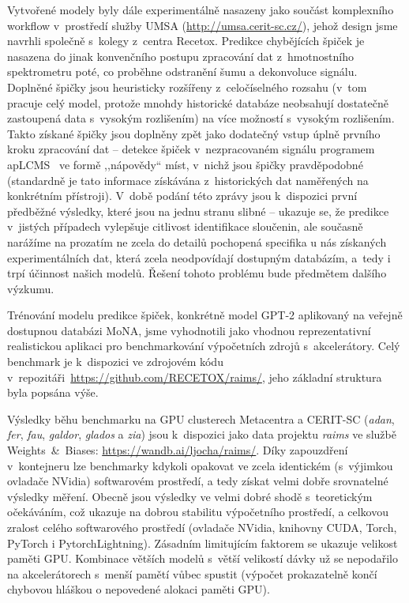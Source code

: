\documentclass[a4paper,11pt]{article}
\begin{document}
Vytvořené modely byly dále experimentálně nasazeny jako součást komplexního workflow
v~prostředí služby UMSA (\url{http://umsa.cerit-sc.cz/}),
jehož design jsme navrhli společně s~kolegy z~centra Recetox.
Predikce chybějících špiček je nasazena do jinak konvenčního postupu zpracování 
dat z~hmotnostního spektrometru poté, co proběhne odstranění šumu a dekonvoluce signálu.
Doplněné špičky jsou heuristicky rozšířeny z~celočíselného rozsahu
(v~tom pracuje celý model, protože mnohdy historické databáze neobsahují dostatečně
zastoupená data s~vysokým rozlišením) na více možností s~vysokým rozlišením.
Takto získané špičky jsou doplněny zpět jako dodatečný vstup úplně prvního kroku
zpracování dat -- detekce špiček v~nezpracovaném signálu programem apLCMS~\cite{aplcms}
ve formě ,,nápovědy`` míst, v~nichž jsou špičky pravděpodobné (standardně je tato informace
získávána z~historických dat naměřených na konkrétním přístroji).
V~době podání této zprávy jsou k~dispozici první předběžné výsledky, které jsou na jednu stranu
slibné -- ukazuje se, že predikce v~jistých případech vylepšuje citlivost identifikace sloučenin,
ale současně narážíme na prozatím ne zcela do detailů pochopená specifika u nás získaných experimentálních
dat, která zcela neodpovídají dostupným databázím, a~tedy i trpí účinnost našich modelů.
Řešení tohoto problému bude předmětem dalšího výzkumu.






Trénování modelu predikce špiček, konkrétně model GPT-2 aplikovaný na veřejně dostupnou databázi MoNA,
jsme vyhodnotili jako vhodnou reprezentativní realistickou aplikaci pro benchmarkování výpočetních zdrojů
s~akcelerátory. 
Celý benchmark je k~dispozici ve zdrojovém kódu v~repozitáři~\url{https://github.com/RECETOX/raims/}, jeho
základní struktura byla popsána výše.

Výsledky běhu benchmarku na GPU clusterech Metacentra a CERIT-SC
(\emph{adan}, \emph{fer}, \emph{fau}, \emph{galdor}, \emph{glados} a \emph{zia})
jsou k~dispozici jako data projektu \emph{raims} ve službě Weights~\&~Biases:
\url{https://wandb.ai/ljocha/raims/}.
Díky zapouzdření v~kontejneru lze benchmarky kdykoli opakovat ve zcela identickém (s~výjimkou ovladače NVidia)
softwarovém prostředí, a tedy získat velmi dobře srovnatelné výsledky měření.
Obecně jsou výsledky ve velmi dobré shodě s~teoretickým očekáváním, což ukazuje na dobrou stabilitu
výpočetního prostředí, a celkovou zralost celého softwarového prostředí
(ovladače NVidia, knihovny CUDA, Torch, PyTorch i PytorchLightning).
Zásadním limitujícím faktorem se ukazuje velikost paměti GPU. 
Kombinace větších modelů s~větší velikostí dávky už se nepodařilo na akcelerátorech
s~menší pamětí vůbec spustit (výpočet prokazatelně končí chybovou hláškou o nepovedené alokaci paměti GPU).
\end{document}
